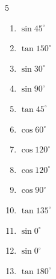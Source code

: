\begin{multicols}{5}
\begin{enumerate}
        \phantom{$\displaystyle =1$}

\columnbreak %

  \item $\displaystyle \sin{45^\circ}$


  \item $\displaystyle \tan{150^\circ}$


  \item $\displaystyle \sin{30^\circ}$


  \item $\displaystyle \sin{90^\circ}$

        \phantom{$\displaystyle =1$}

  \item $\displaystyle \tan{45^\circ}$

        \phantom{$\displaystyle =1$}

  \item $\displaystyle \cos{60^\circ}$


  \item $\displaystyle \cos{120^\circ}$


  \item $\displaystyle \cos{120^\circ}$


  \item $\displaystyle \cos{90^\circ}$

        \phantom{$\displaystyle =0$}

  \item $\displaystyle \tan{135^\circ}$

        \phantom{$\displaystyle =-1$}

  \item $\displaystyle \sin{0^\circ}$

        \phantom{$\displaystyle =0$}

  \item $\displaystyle \sin{0^\circ}$

        \phantom{$\displaystyle =0$}

  \item $\displaystyle \tan{180^\circ}$


\end{enumerate}
\end{multicols}
